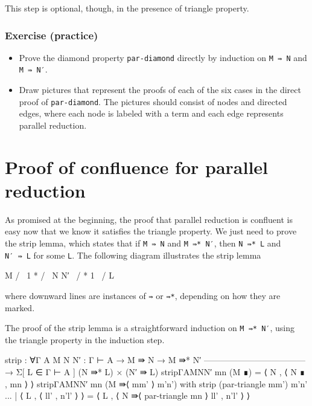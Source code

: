 This step is optional, though, in the presence of triangle property.

\hypertarget{exercise-practice}{%
\subsubsection{Exercise (practice)}\label{exercise-practice}}

\begin{itemize}
\item
  Prove the diamond property \texttt{par-diamond} directly by induction
  on \texttt{M\ ⇛\ N} and \texttt{M\ ⇛\ N′}.
\item
  Draw pictures that represent the proofs of each of the six cases in
  the direct proof of \texttt{par-diamond}. The pictures should consist
  of nodes and directed edges, where each node is labeled with a term
  and each edge represents parallel reduction.
\end{itemize}

\hypertarget{proof-of-confluence-for-parallel-reduction}{%
\section{Proof of confluence for parallel
reduction}\label{proof-of-confluence-for-parallel-reduction}}

As promised at the beginning, the proof that parallel reduction is
confluent is easy now that we know it satisfies the triangle property.
We just need to prove the strip lemma, which states that if
\texttt{M\ ⇛\ N} and \texttt{M\ ⇛*\ N′}, then \texttt{N\ ⇛*\ L} and
\texttt{N′\ ⇛\ L} for some \texttt{L}. The following diagram illustrates
the strip lemma

\begin{myDisplay}
    M
   / \
  1   *
 /     \
N       N′
 \     /
  *   1
   \ /
    L
\end{myDisplay}

where downward lines are instances of \texttt{⇛} or \texttt{⇛*},
depending on how they are marked.

The proof of the strip lemma is a straightforward induction on
\texttt{M\ ⇛*\ N′}, using the triangle property in the induction step.

\begin{fence}
\begin{code}
strip : ∀{Γ A} {M N N′ : Γ ⊢ A}
  → M ⇛ N
  → M ⇛* N′
    ------------------------------------
  → Σ[ L ∈ Γ ⊢ A ] (N ⇛* L)  ×  (N′ ⇛ L)
strip{Γ}{A}{M}{N}{N′} mn (M ∎) = ⟨ N , ⟨ N ∎ , mn ⟩ ⟩
strip{Γ}{A}{M}{N}{N′} mn (M ⇛⟨ mm' ⟩ m'n')
  with strip (par-triangle mm') m'n'
... | ⟨ L , ⟨ ll' , n'l' ⟩ ⟩ = ⟨ L , ⟨ N ⇛⟨ par-triangle mn ⟩ ll' , n'l' ⟩ ⟩
\end{code}
\end{fence}

